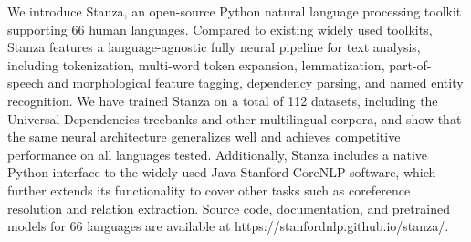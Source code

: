 We introduce Stanza, an open-source Python natural language processing toolkit supporting 66 human languages. Compared to existing widely used toolkits, Stanza features a language-agnostic fully neural pipeline for text analysis, including tokenization, multi-word token expansion, lemmatization, part-of-speech and morphological feature tagging, dependency parsing, and named entity recognition. We have trained Stanza on a total of 112 datasets, including the Universal Dependencies treebanks and other multilingual corpora, and show that the same neural architecture generalizes well and achieves competitive performance on all languages tested. Additionally, Stanza includes a native Python interface to the widely used Java Stanford CoreNLP software, which further extends its functionality to cover other tasks such as coreference resolution and relation extraction. Source code, documentation, and pretrained models for 66 languages are available at https://stanfordnlp.github.io/stanza/.
